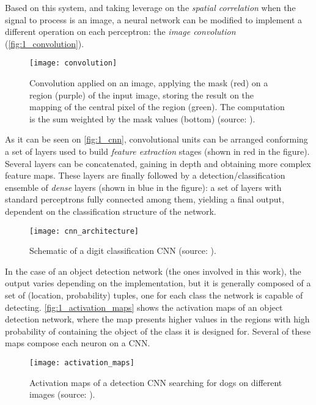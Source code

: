 \begin{figure}[h]

\end{figure}

Based on this system, and taking leverage on the \textit{spatial correlation} when the signal to process is an image, a neural network can be modified to implement a different operation on each perceptron: the \textit{image convolution} (\autoref{fig:1_convolution}).

\begin{figure}[h]
	\centering
	\texttt{[image: convolution]}
	\caption{Convolution applied on an image, applying the mask (red) on a region  (purple) of the input image, storing the result on the mapping of the central pixel of the region (green). The computation is the sum weighted by the mask values (bottom) (source: \cite{tfg}).}
	\label{fig:1_convolution}
\end{figure}

As it can be seen on \autoref{fig:1_cnn}, convolutional units can be arranged conforming a set of layers used to build \textit{feature extraction} stages (shown in red in the figure). Several layers can be concatenated, gaining in depth and obtaining more complex feature maps. These layers are finally followed by a detection/classification ensemble of \textit{dense} layers (shown in blue in the figure): a set of layers with standard perceptrons fully connected among them, yielding a final output, dependent on the classification structure of the network.

\begin{figure}[h]
	\centering
	\texttt{[image: cnn\_architecture]}
	\caption{Schematic of a digit classification CNN (source: \cite{tfg}).}
	\label{fig:1_cnn}
\end{figure}

In the case of an object detection network (the ones involved in this work), the output varies depending on the implementation, but it is generally composed of a set of (location, probability) tuples, one for each class the network is capable of detecting. \autoref{fig:1_activation_maps} shows the activation maps of an object detection network, where the map presents higher values in the regions with high probability of containing the object of the class it is designed for. Several of these maps compose each neuron on a CNN.

\begin{figure}[h]
	\centering
	\texttt{[image: activation\_maps]}
	\caption{Activation maps of a detection CNN searching for dogs on different images (source: \cite{tfg}).}
	\label{fig:1_activation_maps}
\end{figure}


